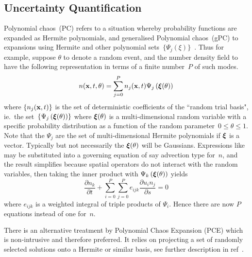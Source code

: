 \subsection{Uncertainty Quantification}\label{sec:sys23UQ}
Polynomial chaos~(PC) refers to a situation whereby probability
functions are expanded as Hermite polynomials, and generalised
Polynomial chaos~(gPC) to expansions using Hermite and other
polynomial sets~$\{\Psi_j(\xi)\}$~\cite{Xi03Mode}.
Thus for example, suppose $\theta$ to denote a random event, and the number density field
to have the following representation in terms of a finite number~$P$ of such modes.
\begin{equation}\label{eq:TrepgPC}
n({\bf x},t, \theta) = \sum_{j=0}^P n_j({\bf x},t) \Psi_j \left(\mbox{\boldmath $\xi$}(\theta)\right)
\end{equation}
where
$\{ n_j({\bf x},t)\}$ is the set of deterministic coefficients of the ``random trial basis",
ie.\ the set~$\{ \Psi_j \left(\mbox{\boldmath $\xi$}(\theta)\right) \}$ where $\mbox{\boldmath $\xi$}(\theta)$ 
is a multi-dimensional random variable with a specific 
probability distribution as a function of the random parameter~$0\leq\theta\leq 1$.
Note that the $\Psi_j$ are the set of multi-dimensional Hermite polynomials if $\mbox{\boldmath $\xi$}$ is a vector.
Typically but not necessarily the $\mbox{\boldmath $\xi$}(\theta)$ will be Gaussians.
Expressions like~ may be substituted into a governing
equation of say advection type for~$n$, and the result simplifies because spatial
operators do not interact with the random variables, then taking the inner product
with $\Psi_k \left(\mbox{\boldmath $\xi$}(\theta)\right)$ yields
\begin{equation}\label{eq:TgPC}
\frac{\partial n_k}{\partial t}+  
\sum_{i=0}^P \sum_{j=0}^P e_{ijk} \frac{\partial u_i n_j}{\partial s}=0
\end{equation}
where $e_{ijk}$ is a weighted integral of triple products of $\Psi_i$.
Hence there are now $P$ equations instead of one for~$n$.

There is an alternative treatment by Polynomial Chaos Expansion (PCE) which is non-intrusive
and therefore preferred. It relies on projecting a set of randomly selected solutions onto
a Hermite or similar basis, see further description in ref~\cite[end \S\,2.1.1]{y2re313}.
